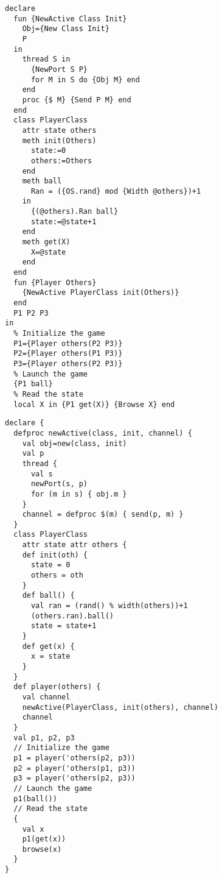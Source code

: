 \begin{lstlisting}[language=oz,label={lst:lstexampleobjoz},title={Ball playing : a program using active objects (\textit{Oz} version)}]
declare
  fun {NewActive Class Init}
    Obj={New Class Init}
    P
  in
    thread S in
      {NewPort S P}
      for M in S do {Obj M} end
    end
    proc {$ M} {Send P M} end
  end
  class PlayerClass
    attr state others
    meth init(Others)
      state:=0
      others:=Others
    end
    meth ball
      Ran = ({OS.rand} mod {Width @others})+1
    in
      {(@others).Ran ball}
      state:=@state+1
    end
    meth get(X)
      X=@state
    end
  end
  fun {Player Others}
    {NewActive PlayerClass init(Others)}
  end
  P1 P2 P3
in
  % Initialize the game
  P1={Player others(P2 P3)}
  P2={Player others(P1 P3)}
  P3={Player others(P2 P3)}
  % Launch the game
  {P1 ball}
  % Read the state
  local X in {P1 get(X)} {Browse X} end
\end{lstlisting}
\begin{lstlisting}[language=newoz,label={lst:lstexampleobjnewoz},title={Ball playing : a program using active objects (\textit{NewOz} version)}]
declare {
  defproc newActive(class, init, channel) {
    val obj=new(class, init)
    val p
    thread {
      val s
      newPort(s, p)
      for (m in s) { obj.m }
    }
    channel = defproc $(m) { send(p, m) }
  }
  class PlayerClass
    attr state attr others {
    def init(oth) {
      state = 0
      others = oth
    }
    def ball() {
      val ran = (rand() % width(others))+1
      (others.ran).ball()
      state = state+1
    }
    def get(x) {
      x = state
    }
  }
  def player(others) {
    val channel
    newActive(PlayerClass, init(others), channel)
    channel
  }
  val p1, p2, p3
  // Initialize the game
  p1 = player('others(p2, p3))
  p2 = player('others(p1, p3))
  p3 = player('others(p2, p3))
  // Launch the game
  p1(ball())
  // Read the state
  {
    val x
    p1(get(x))
    browse(x)
  }
}
\end{lstlisting}
